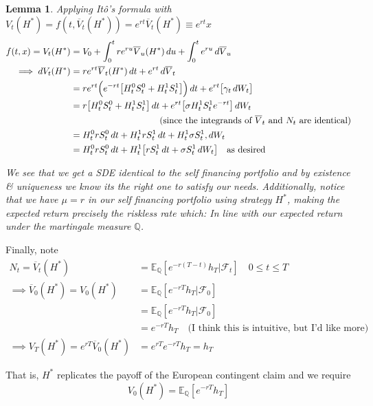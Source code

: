 \documentclass[12pt]{article}
\newtheorem{lemma}{Lemma}
\newlength\tindent
\renewcommand{\indent}{\hspace*{\tindent}}
\begin{document}
\begin{lemma}
Applying It\^{o}'s formula with $V_t(H^*) = f(t,\overline{V}_t(H^*)) = e^{rt}\overline{V}_t(H^*) \equiv e^{rt}x$
\begin{align*}
	f(t,x) = V_t(H^*) &= V_0 + \int^t_0 re^{ru}\overline{V}_u(H^*)\,du + \int^t_0 e^{ru}\,d\overline{V}_u \\
	\implies dV_t(H^*) &= re^{rt}\overline{V}_t(H^*)\,dt + e^{rt}\,d\overline{V}_t \\
	&= re^{rt}\Big(e^{-rt}\big[H^0_tS^0_t + H^1_tS^1_t\big]\Big)\,dt + e^{rt}\big[\gamma_t\,dW_t\big] \\
	&= r\big[H^0_tS^0_t + H^1_tS^1_t\big]\,dt + e^{rt}\big[\sigma H^1_t S^1_t e^{-rt}\big]\,dW_t \\
	&\hphantom{{}={r\big[H^0_tS^0_t + H^1_tS^1_t\big]\,dt}} \text{(since the integrands of $\overline{V}_t$ and $N_t$ are identical)} \\
	&= H^0_trS^0_t\,dt + H^1_trS^1_t\,dt + H^1_t\sigma S^1_t,dW_t \\
	&= H^0_trS^0_t\,dt + H^1_t\big[rS^1_t\,dt + \sigma S^1_t\,dW_t \big] \quad \text{as desired}
\end{align*}


\indent We see that we get a SDE identical to the self financing portfolio and by existence \& uniqueness we know its the right one to satisfy our needs. Additionally, notice that we have $\mu = r$ in our self financing portfolio using strategy $H^*$, making the expected return precisely the riskless rate which: In line with our expected return under the martingale measure $\mathbb Q$.
\end{lemma}

Finally, note
\begin{align*}
	N_t = \overline{V}_t(H^*) &= \mathbb E_{\mathbb Q}[e^{-r(T-t)}h_T|\mathcal F_t] \quad 0 \leq t \leq T \\
	\implies \overline{V}_0(H^*) = V_0(H^*) &= \mathbb E_{\mathbb Q}[e^{-rT}h_T|\mathcal F_0] \\
	&= \mathbb E_{\mathbb Q}[e^{-rT}h_T|\mathcal F_0] \\
	&= e^{-rT}h_T \quad \text{(I think this is intuitive, but I'd like more)} \\
	\implies V_T(H^*) = e^{rT}\overline{V}_0(H^*) &= e^{rT}e^{-rT}h_T = h_T
\end{align*}

That is, $H^*$ replicates the payoff of the European contingent claim and we require
\begin{equation*}
	V_0(H^*) = \mathbb E_{\mathbb Q}[e^{-rT}h_T]
\end{equation*}
\end{document}
